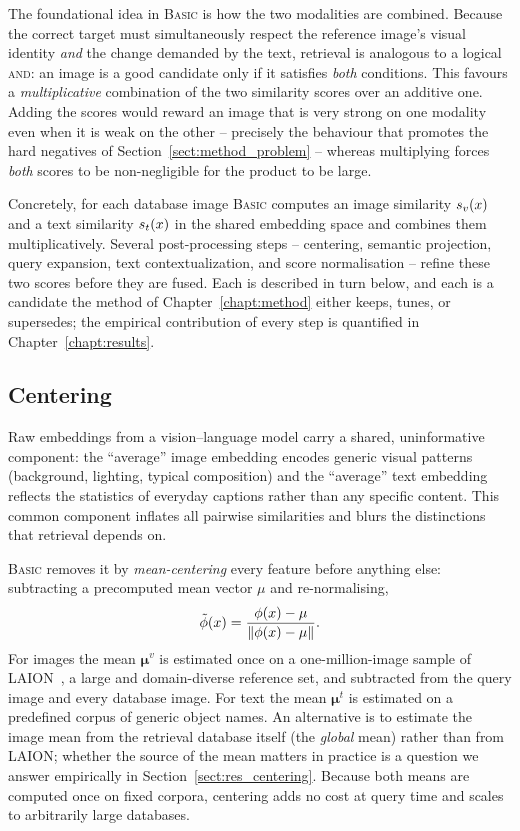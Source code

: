 The foundational idea in \textsc{Basic} is how the two modalities are combined.
Because the correct target must simultaneously respect the reference image's
visual identity \emph{and} the change demanded by the text, retrieval is
analogous to a logical \textsc{and}: an image is a good candidate only if it
satisfies \emph{both} conditions. This favours a \emph{multiplicative} combination
of the two similarity scores over an additive one. Adding the scores would reward
an image that is very strong on one modality even when it is weak on the other --
precisely the behaviour that promotes the hard negatives of
Section~\ref{sect:method_problem} -- whereas multiplying forces \emph{both} scores
to be non-negligible for the product to be large.

Concretely, for each database image \textsc{Basic} computes an image similarity
$s_{v}(x)$ and a text similarity $s_{t}(x)$ in the shared embedding space and
combines them multiplicatively. Several post-processing steps -- centering,
semantic projection, query expansion, text contextualization, and score
normalisation -- refine these two scores before they are fused. Each is described
in turn below, and each is a candidate the method of Chapter~\ref{chapt:method}
either keeps, tunes, or supersedes; the empirical contribution of every step is
quantified in Chapter~\ref{chapt:results}.

\subsection{Centering}\label{subsect:method_centering}

Raw embeddings from a vision--language model carry a shared, uninformative
component: the ``average'' image embedding encodes generic visual patterns
(background, lighting, typical composition) and the ``average'' text embedding
reflects the statistics of everyday captions rather than any specific content.
This common component inflates all pairwise similarities and blurs the
distinctions that retrieval depends on.

\textsc{Basic} removes it by \emph{mean-centering} every feature before anything
else: subtracting a precomputed mean vector $\mu$ and re-normalising,
\begin{equation}\label{eq:centering}
  \tilde{\phi}(x)
  = \frac{\phi(x)-\mu}{\lVert\phi(x)-\mu\rVert}.
\end{equation}
For images the
mean $\bm{\mu}^{v}$ is estimated once on a one-million-image sample of
LAION~\cite{schuhmann2022laion5b}, a large and domain-diverse reference set, and
subtracted from the query image and every database image. For text the mean
$\bm{\mu}^{t}$ is estimated on a predefined corpus of generic object names. An
alternative is to estimate the image mean from the retrieval database itself (the
\emph{global} mean) rather than from LAION; whether the source of the mean matters
in practice is a question we answer empirically in
Section~\ref{sect:res_centering}. Because both means are computed once on fixed
corpora, centering adds no cost at query time and scales to arbitrarily large
databases.

